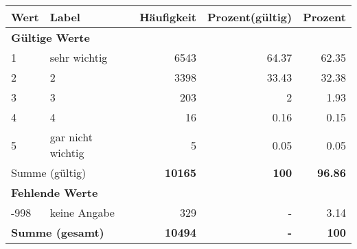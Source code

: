      \begin{longtable}{lXrrr}
     \toprule
     \textbf{Wert} & \textbf{Label} & \textbf{Häufigkeit} & \textbf{Prozent(gültig)} & \textbf{Prozent} \\
     \endhead
     \midrule
     \multicolumn{5}{l}{\textbf{Gültige Werte}}\\

     1 &
     \multicolumn{1}{X}{ sehr wichtig   } &


       \num{6543} &
       \num[round-mode=places,round-precision=2]{64.37} &
         \num[round-mode=places,round-precision=2]{62.35} \\

     2 &
     \multicolumn{1}{X}{ 2   } &


       \num{3398} &
       \num[round-mode=places,round-precision=2]{33.43} &
         \num[round-mode=places,round-precision=2]{32.38} \\

     3 &
     \multicolumn{1}{X}{ 3   } &


       \num{203} &
       \num[round-mode=places,round-precision=2]{2} &
         \num[round-mode=places,round-precision=2]{1.93} \\

     4 &
     \multicolumn{1}{X}{ 4   } &


       \num{16} &
       \num[round-mode=places,round-precision=2]{0.16} &
         \num[round-mode=places,round-precision=2]{0.15} \\

     5 &
     \multicolumn{1}{X}{ gar nicht wichtig   } &


       \num{5} &
       \num[round-mode=places,round-precision=2]{0.05} &
         \num[round-mode=places,round-precision=2]{0.05} \\
     \midrule
     \multicolumn{2}{l}{Summe (gültig)} &
       \textbf{\num{10165}} &
     \textbf{\num{100}} &
       \textbf{\num[round-mode=places,round-precision=2]{96.86}} \\
     \multicolumn{5}{l}{\textbf{Fehlende Werte}}\\
       -998 &
       keine Angabe &
         \num{329} &
        - &
         \num[round-mode=places,round-precision=2]{3.14} \\
     \midrule
     \multicolumn{2}{l}{\textbf{Summe (gesamt)}} &
          \textbf{\num{10494}} &
        \textbf{-} &
        \textbf{\num{100}} \\
     \bottomrule
     \end{longtable}
     

